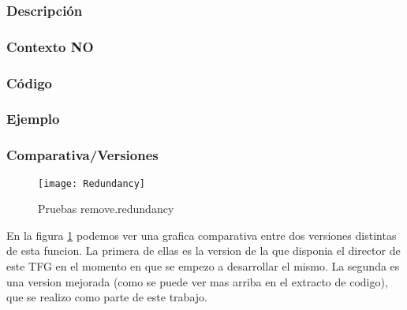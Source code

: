 \subsubsection{Descripci\'on} 
\subsubsection{Contexto NO} 
\subsubsection{C\'odigo} 

\subsubsection{Ejemplo} 
\subsubsection{Comparativa/Versiones} 
\begin{figure}[h]
    \centering
    \texttt{[image: Redundancy]}
    \caption{Pruebas remove.redundancy}
    \label{fig:redundancy}
\end{figure} 

En la figura \ref{fig:redundancy} podemos ver una grafica comparativa entre dos versiones distintas de esta funcion. La primera de ellas es la version de la que disponia el director de este TFG en el momento en que se empezo a desarrollar el mismo. La segunda es una version mejorada (como se puede ver mas arriba en el extracto de codigo), que se realizo como parte de este trabajo.
